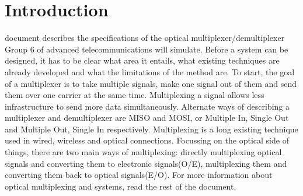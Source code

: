 \section{Introduction}
\label{sec:introduction}

 document describes the specifications of the optical 
multiplexer/demultiplexer Group 6 of advanced telecommunications will simulate.
Before a system can be designed, it has to be clear what area it entails, what existing techniques
are already developed and what the limitations of the method are.
To start, the goal of a multiplexer is to take multiple signals, make one signal out of them
and send them over one carrier at the same time. Multiplexing a signal allows less
infrastructure to send more data simultaneously. Alternate ways of describing a multiplexer
and demultiplexer are MISO and MOSI, or Multiple In, Single Out and Multiple Out, Single In
respectively. Multiplexing is a long existing technique used in wired, wireless and optical 
connections. Focussing on the optical side of things, there are two main ways of multiplexing:
directly multiplexing optical signals and converting them to electronic signals(O/E), 
multiplexing them and converting them back to optical signals(E/O). For more information 
about optical multiplexing and systems, read the rest of the document.
